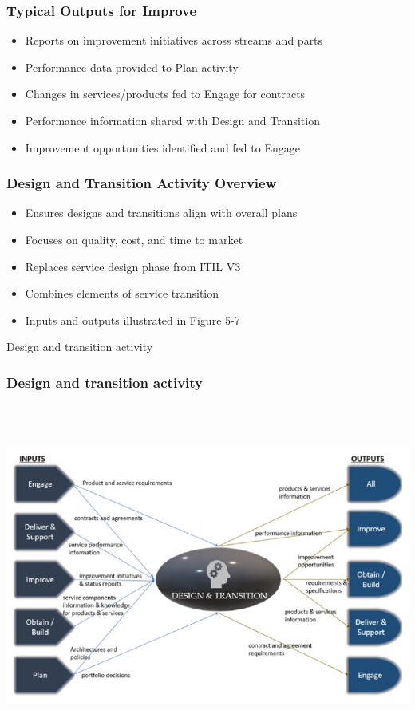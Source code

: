 \documentclass[aspectratio=169, table]{beamer}
\begin{document}
\begin{frame}
	\frametitle{Typical Outputs for Improve}
	\begin{itemize}
		\item Reports on improvement initiatives across streams and parts
		\item Performance data provided to Plan activity
		\item Changes in services/products fed to Engage for contracts
		\item Performance information shared with Design and Transition
		\item Improvement opportunities identified and fed to Engage
	\end{itemize}
\end{frame}

\begin{frame}
	\frametitle{Design and Transition Activity Overview}
	\begin{itemize}
		\item Ensures designs and transitions align with overall plans
		\item Focuses on quality, cost, and time to market
		\item Replaces service design phase from ITIL V3
		\item Combines elements of service transition
		\item Inputs and outputs illustrated in Figure 5-7
	\end{itemize}
\end{frame}

\begin{frame}{Design and transition activity} 	 \frametitle{ Design and transition activity} \begin{center} 	\includegraphics[width=0.6\linewidth]{images/image-06.png} \end{center} \end{frame}
\end{document}
